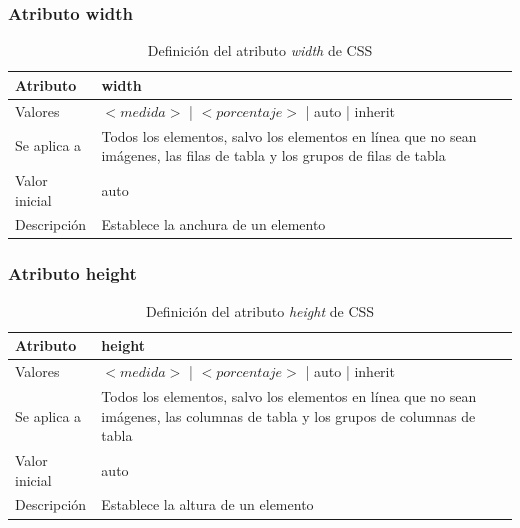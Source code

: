 \documentclass[ucs]{beamer}
\begin{document}

\begin{frame}
\frametitle{Atributo width}

\begin{center}
  \begin{table}
   \begin{tabular}{p{1.8cm}p{7.8cm}}
Atributo &\bf{width} \\ \hline
Valores & $<medida>$ | $<porcentaje>$ | auto | inherit \\ \hline
Se aplica a & Todos los elementos, salvo los elementos en línea que no sean imágenes, las filas de tabla y los grupos de filas de tabla \\ \hline
Valor inicial & auto \\ \hline
Descripción & Establece la anchura de un elemento \\ \hline
  \end{tabular}
   \caption{Definición del atributo \emph{width} de CSS}
 \end{table}
\end{center}

\end{frame}


\begin{frame}
\frametitle{Atributo height}

\begin{center}
  \begin{table}
   \begin{tabular}{p{1.8cm}p{7.8cm}}
Atributo &\bf{height} \\ \hline
Valores & $<medida>$ | $<porcentaje>$ | auto | inherit \\ \hline
Se aplica a & Todos los elementos, salvo los elementos en línea que no sean imágenes, las columnas de tabla y los grupos de columnas de tabla \\ \hline
Valor inicial & auto \\ \hline
Descripción & Establece la altura de un elemento \\ \hline
  \end{tabular}
   \caption{Definición del atributo \emph{height} de CSS}
 \end{table}
\end{center}

\end{frame}
\end{document}
